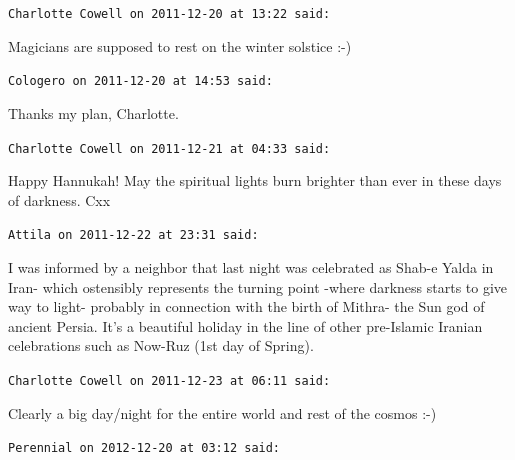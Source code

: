 \begin{footnotesize}
\begin{sffamily}
\texttt{Charlotte Cowell on 2011-12-20 at 13:22 said:}

Magicians are supposed to rest on the winter solstice :-)

\hfill

\texttt{Cologero on 2011-12-20 at 14:53 said:}

Thanks my plan, Charlotte.

\hfill

\texttt{Charlotte Cowell on 2011-12-21 at 04:33 said:}

Happy Hannukah! May the spiritual lights burn brighter than ever in these days of darkness. Cxx

\hfill

\texttt{Attila on 2011-12-22 at 23:31 said:}

I was informed by a neighbor that last night was celebrated as Shab-e Yalda in Iran- which ostensibly represents the turning point -where darkness starts to give way to light- probably in connection with the birth of Mithra- the Sun god of ancient Persia. It's a beautiful holiday in the line of other pre-Islamic Iranian celebrations such as Now-Ruz (1st day of Spring).

\hfill

\texttt{Charlotte Cowell on 2011-12-23 at 06:11 said:}

Clearly a big day/night for the entire world and rest of the cosmos :-)

\hfill

\texttt{Perennial on 2012-12-20 at 03:12 said:}


\end{sffamily}
\end{footnotesize}
